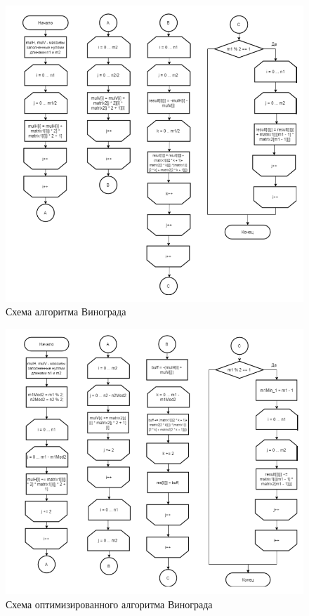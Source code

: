\documentclass[12pt]{report}
\begin{document}
\begin{figure}[!htbp]
	\centering
	\includegraphics[scale=1]{m_winograd.png}
	\caption{Схема алгоритма Винограда}
	\label{fig:mpr}
\end{figure}


\begin{figure}[!htbp]
	\centering
	\includegraphics[scale=1]{imp_winograd}
	\caption{Схема оптимизированного алгоритма Винограда}
	\label{fig:mpr}
\end{figure}
\end{document}
